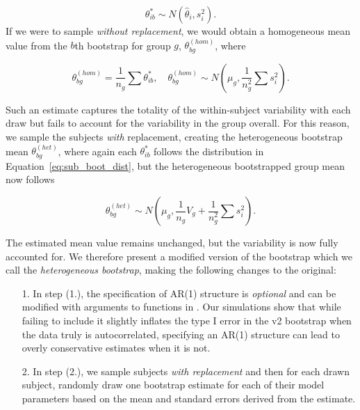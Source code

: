 \begin{equation}\label{eq:sub_boot_dist}
\theta^*_{ib} \sim N(\hat{\theta}_i, s_i^2).
\end{equation}
If we were to sample \textit{without replacement}, we would obtain a homogeneous mean value from the $b$th bootstrap for group $g$, $\theta^{(hom)}_{bg}$, where

\begin{equation}\label{eq:wo_rep_boot}
\theta^{(hom)}_{bg} = \frac{1}{n_g} \sum \theta^{*}_{ib}, \quad \theta^{(hom)}_{bg} \sim N \left( \mu_{g}, \frac{1}{n_g^2} \sum s_i^2 \right).
\end{equation}

Such an estimate captures the totality of the within-subject variability with each draw but fails to account for the variability in the group overall. For this reason, we sample the subjects \textit{with} replacement, creating the heterogeneous bootstrap mean $\theta_{bg}^{(het)}$, where again each $\theta_{ib}^*$ follows the distribution in Equation~\ref{eq:sub_boot_dist}, but the heterogeneous bootstrapped group mean now follows

\begin{equation}\label{eq:w_rep_boot}
\theta_{bg}^{(het)} \sim N \left( \mu_{g}, \frac{1}{n_g} V_{g} + \frac{1}{n_g^2} \sum s_i^2 \right).
\end{equation}

The estimated mean value remains unchanged, but the variability is now fully accounted for. We therefore present a modified version of the bootstrap which we call the \textit{heterogeneous bootstrap}, making the following changes to the original: 

\begin{enumerate}
\item[1.] In step (1.), the specification of AR(1) structure is \textit{optional} and can be modified with arguments to functions in . Our simulations show that while failing to include it slightly inflates the type I error in the v2 bootstrap when the data truly is autocorrelated, specifying an AR(1) structure can lead to overly conservative estimates when it is not.
\item[2.] In step (2.), we sample subjects \textit{with replacement} and then for each drawn subject, randomly draw one bootstrap estimate for each of their model parameters based on the mean and standard errors derived from the  estimate.
\end{enumerate}

